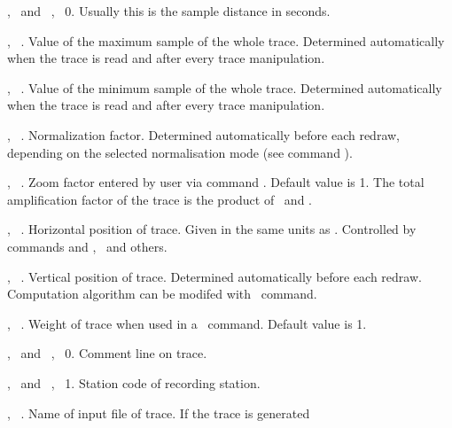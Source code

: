 \begin{deflist}{}
   \item[\shi{delta}]
      , \ and \ ,
      \ 0.  Usually this is the
      sample distance in seconds.
   \item[\shi{maxval}]
      , \ .
      Value of the maximum sample of the whole trace.  Determined
      automatically when the trace is read and after every trace
      manipulation.
   \item[\shi{minval}]
      , \ .
      Value of the minimum sample of the whole trace.  Determined
      automatically when the trace is read and after every trace
      manipulation.
   \item[\shi{norm}]
      ,  \ .
      Normalization factor.  Determined automatically before
      each redraw, depending on the selected normalisation mode
      (see command ).
   \item[\shi{zoom}]
      , \ .
      Zoom factor entered by user via command .  Default value
      is 1.  The total amplification factor of the trace is
      the product of \ and .
   \item[\shi{t-origin}]
      , \ .
      Horizontal position of trace.  Given in the same units
      as .  Controlled by commands  and
      , \ and others.
   \item[\shi{s-origin}]
      , \ .
      Vertical position of trace.  Determined automatically before
      each redraw.  Computation algorithm can be modifed with
      \ command.
   \item[\shi{weight}]
      , \ .
      Weight of trace when used in a \ command.  Default
      value is 1.
   \item[\shi{comment}]
      , \ and \ ,
      \ 0.  Comment line on trace.
   \item[\shi{station}]
      , \ and \ ,
      \ 1.  Station code of
      recording station.
   \item[\shi{file}]
      , \ .
      Name of input file of trace.  If the trace is generated

\end{deflist}
